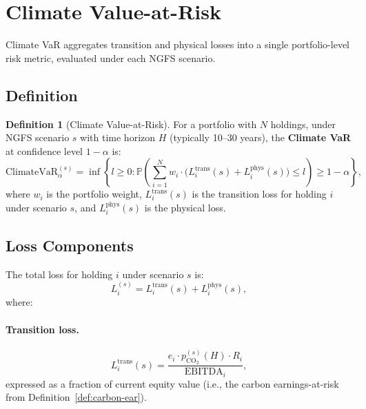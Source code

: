 \documentclass[11pt, a4paper]{article}
\theoremstyle{definition}
\newtheorem{definition}{Definition}[section]
\theoremstyle{plain}
\theoremstyle{remark}
\newcommand{\PV}{\mathbb{P}}
\begin{document}
\section{Climate Value-at-Risk}
\label{sec:climate-var}

Climate VaR aggregates transition and physical losses into a single portfolio-level
risk metric, evaluated under each NGFS scenario.

\subsection{Definition}

\begin{definition}[Climate Value-at-Risk]\label{def:climate-var}
For a portfolio with $N$ holdings, under NGFS scenario $s$ with time horizon $H$
(typically 10--30 years), the \textbf{Climate VaR} at confidence level $1 - \alpha$
is:
\begin{equation}\label{eq:climate-var}
    \text{ClimateVaR}_\alpha^{(s)} = \inf\left\{l \geq 0 :
    \PV\!\left(\sum_{i=1}^{N} w_i \cdot
    \bigl(L_i^{\text{trans}}(s) + L_i^{\text{phys}}(s)\bigr) \leq l\right)
    \geq 1 - \alpha\right\},
\end{equation}
where $w_i$ is the portfolio weight, $L_i^{\text{trans}}(s)$ is the transition
loss for holding $i$ under scenario $s$, and $L_i^{\text{phys}}(s)$ is the
physical loss.
\end{definition}

\subsection{Loss Components}

The total loss for holding $i$ under scenario $s$ is:
\begin{equation}\label{eq:total-loss}
    L_i^{(s)} = L_i^{\text{trans}}(s) + L_i^{\text{phys}}(s),
\end{equation}
where:

\paragraph{Transition loss.}
\begin{equation}\label{eq:trans-loss}
    L_i^{\text{trans}}(s) = \frac{e_i \cdot p_{\text{CO}_2}^{(s)}(H)
    \cdot R_i}{\text{EBITDA}_i},
\end{equation}
expressed as a fraction of current equity value (i.e., the carbon
earnings-at-risk from Definition~\ref{def:carbon-ear}).
\end{document}
